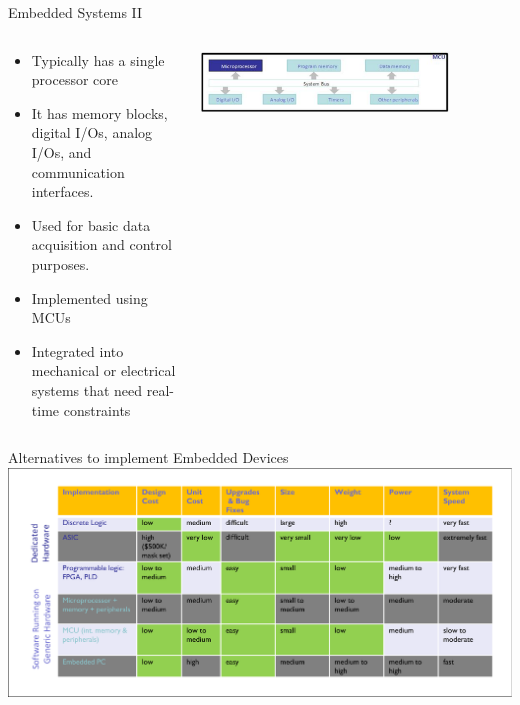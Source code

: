 \begin{frame}{Embedded Systems II}
\begin{columns}
      \begin{column}{0.5\textwidth} 
          \begin{itemize}
            \item Typically has a single processor core
            \item It has memory blocks, digital I/Os, analog I/Os, and communication interfaces.
            \item  Used for basic data acquisition and control purposes.
            \item  Implemented using MCUs
            \item  Integrated into mechanical or electrical systems that need real-time constraints
          \end{itemize}
        \end{column}
        \begin{column}{0.5\textwidth}
        \includegraphics[width=0.8\textwidth]{trainingmaterials/rpibasics/mcu.pdf}
        \end{column}
  \end{columns}
\end{frame}

\begin{frame}{Alternatives to implement Embedded Devices}
    \centering
     \includegraphics[width=\textwidth]{trainingmaterials/rpibasics/alternatives.pdf}
\end{frame}

